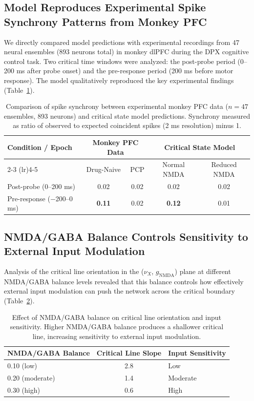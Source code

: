 \documentclass[11pt]{article}
\begin{document}
\subsection{Model Reproduces Experimental Spike Synchrony Patterns from Monkey PFC}

We directly compared model predictions with experimental recordings from 47 neural ensembles (893 neurons total) in monkey dlPFC during the DPX cognitive control task. Two critical time windows were analyzed: the post-probe period (0--200 ms after probe onset) and the pre-response period (200 ms before motor response). The model qualitatively reproduced the key experimental findings (Table~\ref{tab:model_vs_data}).

\begin{table}[H]
\centering
\caption{Comparison of spike synchrony between experimental monkey PFC data ($n = 47$ ensembles, 893 neurons) and critical state model predictions. Synchrony measured as ratio of observed to expected coincident spikes (2 ms resolution) minus 1.}
\label{tab:model_vs_data}
\begin{tabular}{lcccc}
\toprule
\textbf{Condition / Epoch} & \multicolumn{2}{c}{\textbf{Monkey PFC Data}} & \multicolumn{2}{c}{\textbf{Critical State Model}} \\
\cmidrule(lr){2-3} \cmidrule(lr){4-5}
 & Drug-Naive & PCP & Normal NMDA & Reduced NMDA \\
\midrule
Post-probe (0--200 ms) & 0.02 & 0.02 & 0.02 & 0.02 \\
Pre-response ($-$200--0 ms) & \textbf{0.11} & 0.02 & \textbf{0.12} & 0.01 \\
\bottomrule
\end{tabular}
\end{table}

\subsection{NMDA/GABA Balance Controls Sensitivity to External Input Modulation}

Analysis of the critical line orientation in the ($\nu_X$, $g_{\mathrm{NMDA}}$) plane at different NMDA/GABA balance levels revealed that this balance controls how effectively external input modulation can push the network across the critical boundary (Table~\ref{tab:nmda_gaba_balance}).

\begin{table}[H]
\centering
\caption{Effect of NMDA/GABA balance on critical line orientation and input sensitivity. Higher NMDA/GABA balance produces a shallower critical line, increasing sensitivity to external input modulation.}
\label{tab:nmda_gaba_balance}
\begin{tabular}{lcl}
\toprule
\textbf{NMDA/GABA Balance} & \textbf{Critical Line Slope} & \textbf{Input Sensitivity} \\
\midrule
0.10 (low) & 2.8 & Low \\
0.20 (moderate) & 1.4 & Moderate \\
0.30 (high) & 0.6 & High \\
\bottomrule
\end{tabular}
\end{table}
\end{document}
